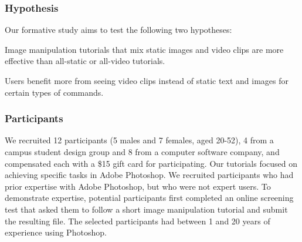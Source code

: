 \subsubsection{Hypothesis}
Our formative study aims to test the following two hypotheses:

 Image manipulation tutorials that mix static images and video clips are more effective than all-static or all-video tutorials.

 Users benefit more from seeing video clips instead of static text and images for certain types of commands.

\subsubsection{Participants}
We recruited 12 participants (5 males and 7 females, aged 20-52), 4 from a campus student design group and 8 from a computer software company, and compensated each with a \$15 gift card for participating. Our tutorials focused on achieving specific tasks in Adobe Photoshop. We recruited participants who had prior expertise with Adobe Photoshop, but who were not expert users. To demonstrate expertise, potential participants first completed an online screening test that asked them to follow a short image manipulation tutorial and submit the resulting file. The selected participants had between 1 and 20 years of experience using Photoshop.

